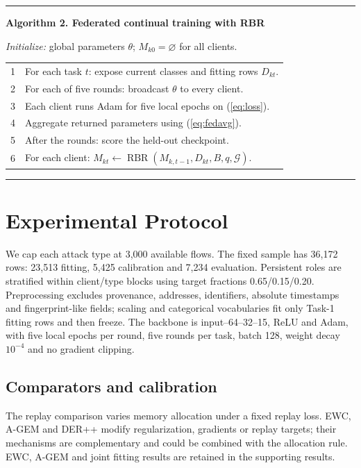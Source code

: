 \documentclass[journal,10pt]{IEEEtran}
\begin{document}
\noindent\begin{minipage}{\columnwidth}
\smallskip\hrule\smallskip
\footnotesize\textbf{Algorithm 2. Federated continual training with RBR}\par
\textit{Initialize:} global parameters $\theta$; $M_{k0}=\varnothing$ for all clients.
\begin{tabular}{@{}r@{\quad}p{}@{}}
1 & For each task $t$: expose current classes and fitting rows $D_{kt}$.\\
2 & For each of five rounds: broadcast $\theta$ to every client.\\
3 & Each client runs Adam for five local epochs on (\ref{eq:loss}).\\
4 & Aggregate returned parameters using (\ref{eq:fedavg}).\\
5 & After the rounds: score the held-out checkpoint.\\
6 & For each client: $M_{kt}\leftarrow\operatorname{RBR}(M_{k,t-1},D_{kt},B,q,\mathcal G)$.\\
\end{tabular}
\smallskip\hrule\smallskip
\end{minipage}

\section{Experimental Protocol}
We cap each attack type at 3,000 available flows. The fixed sample has 36,172 rows: 23,513 fitting, 5,425 calibration and 7,234 evaluation. Persistent roles are stratified within client/type blocks using target fractions 0.65/0.15/0.20. Preprocessing excludes provenance, addresses, identifiers, absolute timestamps and fingerprint-like fields; scaling and categorical vocabularies fit only Task-1 fitting rows and then freeze. The backbone is input--64--32--15, ReLU and Adam, with five local epochs per round, five rounds per task, batch 128, weight decay $10^{-4}$ and no gradient clipping.

\subsection{Comparators and calibration}
The replay comparison varies memory allocation under a fixed replay loss. EWC, A-GEM and DER++ modify regularization, gradients or replay targets; their mechanisms are complementary and could be combined with the allocation rule. EWC, A-GEM and joint fitting results are retained in the supporting results.
\end{document}
